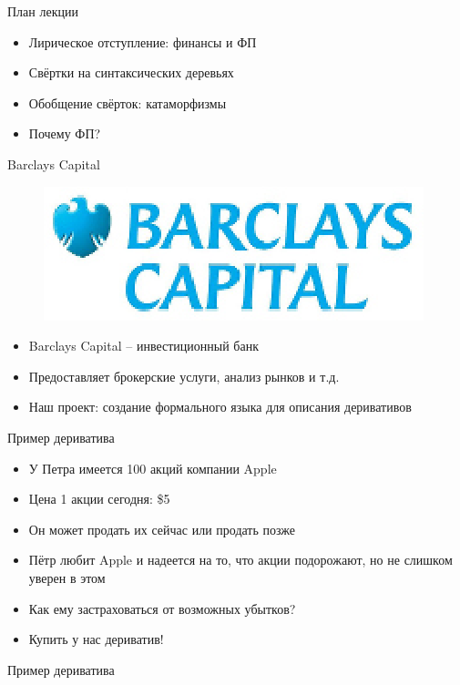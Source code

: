 \documentclass{beamer}
\author{Иван Веселов}
\institute{Barclays Capital}
\date{28 октября 2011 г.}
\begin{document}
\begin{frame}{План лекции}
\begin{itemize}
\item
  Лирическое отступление: финансы и ФП
\item
  Свёртки на синтаксических деревьях
\item
  Обобщение свёрток: катаморфизмы
\item
  Почему ФП?
\end{itemize}

\end{frame}\begin{frame}{Barclays Capital}

\begin{figure}[htbp]
\centering
\includegraphics{lecture6/barclays.eps}
\caption{}
\end{figure}

\begin{itemize}
\item
  Barclays Capital -- инвестиционный банк
\item
  Предоставляет брокерские услуги, анализ рынков и т.д.
\item
  Наш проект: создание формального языка для описания деривативов
\end{itemize}
\end{frame}\begin{frame}{Пример дериватива}

\begin{itemize}
\item
  У Петра имеется 100 акций компании Apple
\item
  Цена 1 акции сегодня: \$5
\item
  Он может продать их сейчас или продать позже
\item
  Пётр любит Apple и надеется на то, что акции подорожают, но не слишком
  уверен в этом
\item
  Как ему застраховаться от возможных убытков?
\item
  Купить у нас дериватив!
\end{itemize}
\end{frame}\begin{frame}{Пример дериватива}


\end{frame}
\end{document}
